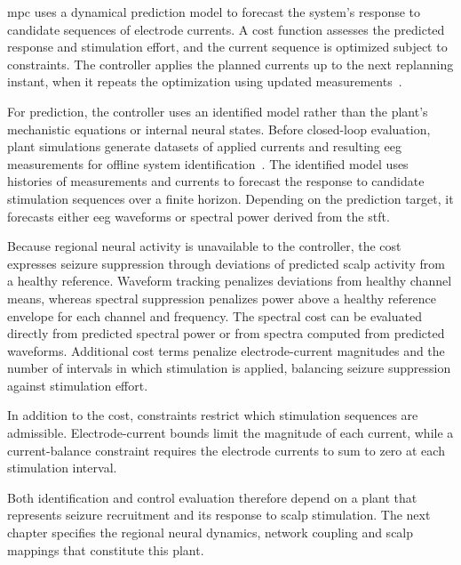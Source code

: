 \Ac{mpc} uses a dynamical prediction model to forecast the system's response to candidate sequences of electrode currents.
A cost function assesses the predicted response and stimulation effort, and the current sequence is optimized subject to constraints.
The controller applies the planned currents up to the next replanning instant, when it repeats the optimization using updated measurements~\cite{Rawlings2017}.

For prediction, the controller uses an identified model rather than the plant's mechanistic equations or internal neural states.
Before closed-loop evaluation, plant simulations generate datasets of applied currents and resulting \ac{eeg} measurements for offline system identification~\cite{Ljung1999}.
The identified model uses histories of measurements and currents to forecast the response to candidate stimulation sequences over a finite horizon.
Depending on the prediction target, it forecasts either \ac{eeg} waveforms or spectral power derived from the \ac{stft}.

Because regional neural activity is unavailable to the controller, the cost expresses seizure suppression through deviations of predicted scalp activity from a healthy reference.
Waveform tracking penalizes deviations from healthy channel means, whereas spectral suppression penalizes power above a healthy reference envelope for each channel and frequency.
The spectral cost can be evaluated directly from predicted spectral power or from spectra computed from predicted waveforms.
Additional cost terms penalize electrode-current magnitudes and the number of intervals in which stimulation is applied, balancing seizure suppression against stimulation effort.

In addition to the cost, constraints restrict which stimulation sequences are admissible.
Electrode-current bounds limit the magnitude of each current, while a current-balance constraint requires the electrode currents to sum to zero at each stimulation interval.

Both identification and control evaluation therefore depend on a plant that represents seizure recruitment and its response to scalp stimulation.
The next chapter specifies the regional neural dynamics, network coupling and scalp mappings that constitute this plant.
